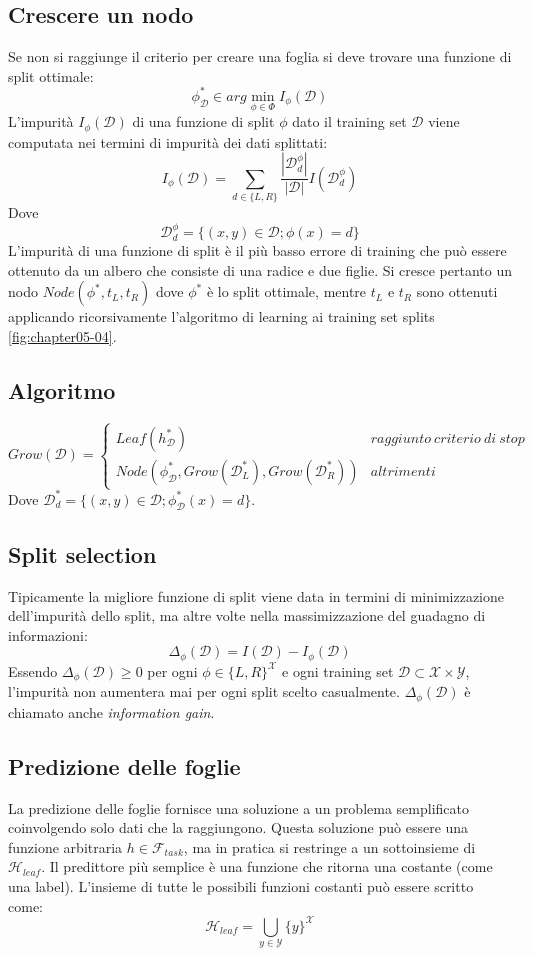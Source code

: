	\subsection{Crescere un nodo}
	Se non si raggiunge il criterio per creare una foglia si deve trovare una funzione di split ottimale:
	$$\phi^*_\mathcal{D}\in arg\min\limits_{\phi\in\Phi}I_\phi(\mathcal{D})$$
	L'impurit\`a $I_\phi(\mathcal{D})$ di una funzione di split $\phi$ dato il training set $\mathcal{D}$ viene computata nei termini di impurit\`a dei dati splittati:
	$$I_\phi(\mathcal{D})=\sum\limits_{d\in\{L,R\}}\dfrac{|\mathcal{D}^\phi_d|}{|\mathcal{D}|}I(\mathcal{D}^\phi_d)$$
	Dove
	$$\mathcal{D}^\phi_d = \{(x, y)\in\mathcal{D};\phi(x)=d\}$$
	L'impurit\`a di una funzione di split \`e il pi\`u basso errore di training che pu\`o essere ottenuto da un albero che consiste di una radice e due figlie.
	Si cresce pertanto un nodo $Node(\phi^*, t_L, t_R)$ dove $\phi^*$ \`e lo split ottimale, mentre $t_L$ e $t_R$ sono ottenuti applicando ricorsivamente l'algoritmo di learning ai training set splits \ref{fig:chapter05-04}. 
	
	\subsection{Algoritmo}
	$$Grow(\mathcal{D})=\begin{cases}Leaf(h^*_\mathcal{D}) &raggiunto\ criterio\ di\ stop\\
		Node(\phi^*_\mathcal{D}, Grow(\mathcal{D}^*_L), Grow(\mathcal{D}^*_R)) &altrimenti
	\end{cases}$$
	Dove $\mathcal{D}^*_d=\{(x, y)\in\mathcal{D};\phi^*_\mathcal{D}(x)=d\}$.
	
	\subsection{Split selection}
	Tipicamente la migliore funzione di split viene data in termini di minimizzazione dell'impurit\`a dello split, ma altre volte nella massimizzazione del guadagno di informazioni:
	$$\Delta_\phi(\mathcal{D})=I(\mathcal{D})-I_\phi(\mathcal{D})$$
	Essendo $\Delta_\phi(\mathcal{D})\ge 0$ per ogni $\phi\in\{L,R\}^{\mathcal{X}}$ e ogni training set $\mathcal{D}\subset\mathcal{X}\times\mathcal{Y}$, l'impurit\`a non aumentera mai per ogni split scelto casualmente. 
	$\Delta_\phi(\mathcal{D})$ \`e chiamato anche \emph{information gain}.
	
	\subsection{Predizione delle foglie}
	La predizione delle foglie fornisce una soluzione a un problema semplificato coinvolgendo solo dati che la raggiungono.
	Questa soluzione pu\`o essere una funzione arbitraria $h\in\mathcal{F}_{task}$, ma in pratica si restringe a un sottoinsieme di $\mathcal{H}_{leaf}$.
	Il predittore pi\`u semplice \`e una funzione che ritorna una costante (come una label).
	L'insieme di tutte le possibili funzioni costanti pu\`o essere scritto come:
	$$\mathcal{H}_{leaf} = \bigcup\limits_{y\in\mathcal{Y}}\{y\}^{\mathcal{X}}$$

